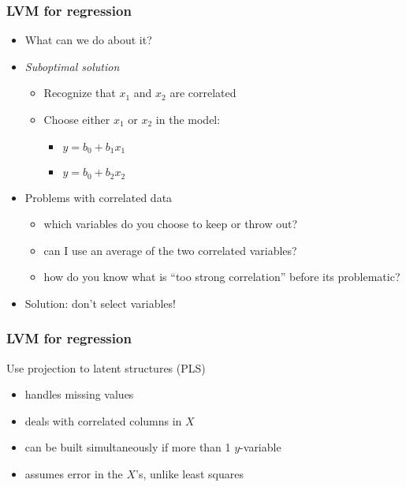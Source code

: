 \begin{frame}\frametitle{LVM for regression}
	\begin{itemize}
		\item	What can we do about it?
		\item	\emph{Suboptimal solution}
		\begin{itemize}
			\item	Recognize that $x_1$ and $x_2$ are correlated
			\item	Choose either $x_1$ or $x_2$ in the model:
			\begin{itemize}
				\item	$y = b_0 + b_1 x_1$
				\item	$y = b_0 + b_2 x_2$
			\end{itemize}
		\end{itemize}
	\end{itemize}
	\begin{itemize}
		\item	Problems with correlated data
		\begin{itemize}
			\item	which variables do you choose to keep or throw out?
			\item	can I use an average of the two correlated variables?
			\item	how do you know what is ``too strong correlation'' before its problematic?
		\end{itemize}
	\end{itemize}
	\begin{itemize}
		\item	Solution: don't select variables!
	\end{itemize}
\end{frame}

\begin{frame}\frametitle{LVM for regression}

	Use projection to latent structures (PLS)
	\begin{itemize}
		\item	handles missing values
		\item	deals with correlated columns in $X$
		\item	can be built simultaneously if more than 1 $y$-variable
		\item	assumes error in the $X$'s, unlike least squares
	\end{itemize}
\end{frame}

